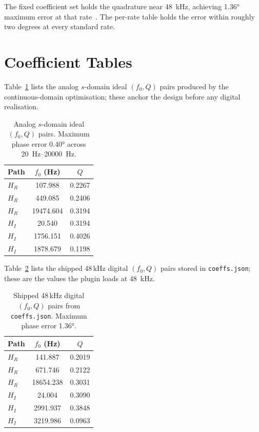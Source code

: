 \documentclass[11pt,a4paper]{article}
\begin{document}
The fixed coefficient set holds the quadrature near \SI{48}{\kilo\hertz}, achieving \ang{1.36} maximum error at that rate~\cite{mastrorillo2023uhj}.
The per-rate table holds the error within roughly two degrees at every standard rate.

\appendix

\section{Coefficient Tables}

Table~\ref{tab:analog-app} lists the analog $s$-domain ideal $(f_0, Q)$ pairs produced by the continuous-domain optimisation; these anchor the design before any digital realisation.

\begin{table}[h]
\centering
\caption{Analog $s$-domain ideal $(f_0, Q)$ pairs. Maximum phase error \ang{0.40} across \SIrange{20}{20000}{\hertz}.}
\label{tab:analog-app}
\begin{tabular}{@{}lcc@{}}
\toprule
Path & $f_0$ (Hz) & $Q$ \\
\midrule
$H_R$ & 107.988   & 0.2267 \\
$H_R$ & 449.085   & 0.2406 \\
$H_R$ & 19474.604 & 0.3194 \\
\addlinespace
$H_I$ & 20.540    & 0.3194 \\
$H_I$ & 1756.151  & 0.4026 \\
$H_I$ & 1878.679  & 0.1198 \\
\bottomrule
\end{tabular}
\end{table}

Table~\ref{tab:digital-app} lists the shipped 48\,kHz digital $(f_0, Q)$ pairs stored in \texttt{coeffs.json}; these are the values the plugin loads at \SI{48}{\kilo\hertz}.

\begin{table}[h]
\centering
\caption{Shipped 48\,kHz digital $(f_0, Q)$ pairs from \texttt{coeffs.json}. Maximum phase error \ang{1.36}.}
\label{tab:digital-app}
\begin{tabular}{@{}lcc@{}}
\toprule
Path & $f_0$ (Hz) & $Q$ \\
\midrule
$H_R$ & 141.887  & 0.2019 \\
$H_R$ & 671.746  & 0.2122 \\
$H_R$ & 18654.238 & 0.3031 \\
\addlinespace
$H_I$ & 24.004   & 0.3090 \\
$H_I$ & 2991.937 & 0.3848 \\
$H_I$ & 3219.986 & 0.0963 \\
\bottomrule
\end{tabular}
\end{table}
\end{document}
